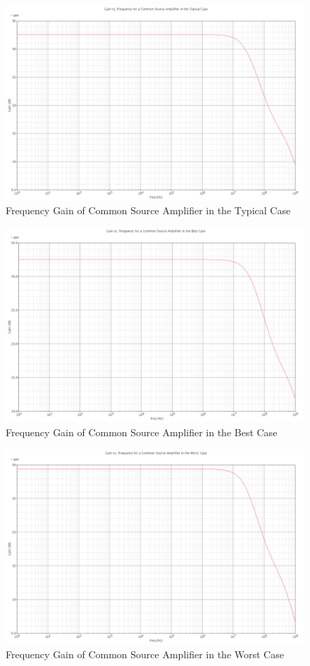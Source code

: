 \documentclass{article}
\begin{document}
\begin{figure}[H]
\centering
\includegraphics[width=5in]{2_cs_gain_tt.png}
\caption{Frequency Gain of Common Source Amplifier in the Typical Case}
\label{cs_tt}
\end{figure}

\begin{figure}[H]
\centering
\includegraphics[width=6in]{2_cs_gain_ff.png}
\caption{Frequency Gain of Common Source Amplifier in the Best Case}
\label{cs_ff}
\end{figure}

\begin{figure}[H]
\centering
\includegraphics[width=6in]{2_cs_gain_ss.png}
\caption{Frequency Gain of Common Source Amplifier in the Worst Case}
\label{cs_ss}
\end{figure}
\end{document}
